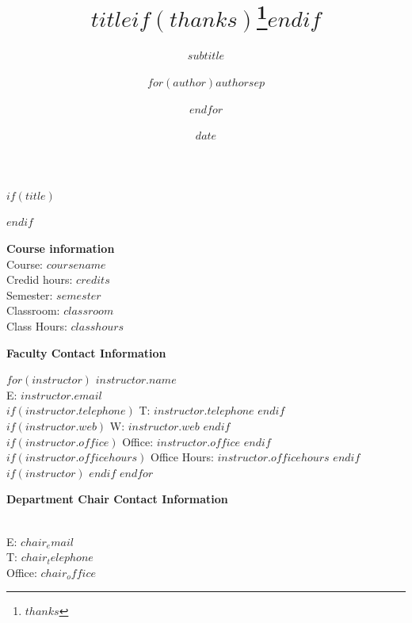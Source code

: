 \documentclass[$if(fontsize)$$fontsize$,$endif$$if(lang)$$babel-lang$,$endif$$if(papersize)$$papersize$,$endif$$for(classoption)$$classoption$$sep$,$endfor$]{article}
\title{\textcolor{unhtext}{$title$}$if(thanks)$\thanks{$thanks$}$endif$}
\subtitle{\textcolor{unhtext}{$subtitle$}}
\date{\textcolor{unhtext}{$date$}}
\date{}
\author{$for(author)$\textcolor{unhtext}{$author$}$sep$ \and $endfor$}
\begin{document}
  

	$if(title)$
	\maketitle
	$endif$
	
	
		\thispagestyle{firststyle}


\vspace{-12pt}
\noindent\Large{\textbf{\textcolor{unhtext}{Course information}}}\vspace{3pt}\\
  Course: $coursename$\\
  Credid hours: $credits$\\
  Semester: $semester$\\
  Classroom: $classroom$\\
  Class Hours: $classhours$

\vspace{10pt}
\noindent\textbf{\Large{\textcolor{unhtext}{Faculty Contact Information}}}
\vspace{-8pt}
\begin{multicols}{2}
$for(instructor)$
  \noindent $instructor.name$\\
  E: $instructor.email$\\
  $if(instructor.telephone)$
  T: $instructor.telephone$
  $endif$\\
  $if(instructor.web)$ 
  W: \href{http://$instructor.web$}{\tt $instructor.web$}
  $endif$\\
  $if(instructor.office)$
  Office: $instructor.office$
  $endif$\\
  $if(instructor.officehours)$
  Office Hours: $instructor.officehours$
  $endif$\\
  $if(instructor)$
  \columnbreak
  $endif$
  $endfor$
\end{multicols}
 
 \vspace{-20pt}

\noindent\textbf{\Large{\textcolor{unhtext}{Department Chair Contact Information}}}\\
\vspace{-26pt}
 \begin{multicols}{2}
\\
  E: $chair_email$\\
  \vfill\columnbreak
  T: $chair_telephone$\\
  Office: $chair_office$\\
\end{multicols}
\end{document}
